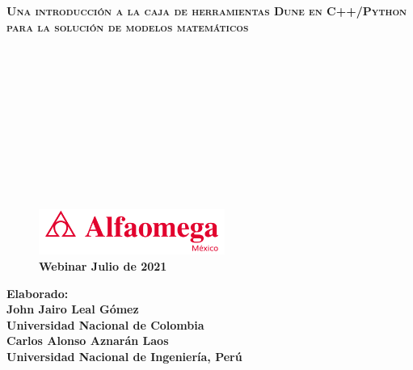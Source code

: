 



{
\begin{frame}

	\color{c++reviewduneblue}

	\begin{flushleft}\bfseries\scshape\huge
		Una introducción a la caja de herramientas Dune en
		C++/Python para la solución de modelos matemáticos
	\end{flushleft}

	\

	\

	\

	\

	\

	\

	\begin{minipage}{0.47\textwidth}
		\begin{figure}[ht!]
			\centering
			\includegraphics[height=1.5cm]{alfaomega}
			\caption*{\large\bfseries\textcolor{c++reviewduneblue}{Webinar Julio de 2021}}
		\end{figure}
	\end{minipage}
	\begin{minipage}{0.5\textwidth}
		\begin{flushright}\large\bfseries
			Elaborado:\\
			John Jairo Leal Gómez\\
			Universidad Nacional de Colombia\\
			Carlos Alonso Aznarán Laos\\
			Universidad Nacional de Ingeniería, Perú
		\end{flushright}
	\end{minipage}

\end{frame}
}

